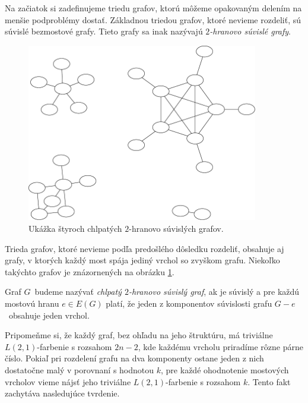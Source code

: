 Na začiatok si zadefinujeme triedu grafov, ktorú môžeme opakovaným delením na menšie
podproblémy dostať. Základnou triedou grafov, ktoré nevieme rozdeliť, sú súvislé
bezmostové grafy. Tieto grafy sa inak nazývajú \emph{$2$-hranovo súvislé grafy}.

\begin{figure}
\centerline{\includegraphics[width=0.9\textwidth]{images/ec2_example.pdf}}

\caption[Chlpaté $2$-hranovo súvislé grafy]{Ukážka štyroch
chlpatých $2$-hranovo súvislých grafov.}

\label{graf:ec2}
\end{figure}

Trieda grafov, ktoré nevieme podľa predošlého dôsledku rozdeliť, obsahuje aj grafy,
v ktorých každý most spája jediný vrchol so zvyškom grafu. Niekoľko takýchto grafov je
znázornených na obrázku \ref{graf:ec2}.

\begin{defn}
    Graf $G$ budeme nazývať \emph{chlpatý $2$-hranovo súvislý graf}, ak je súvislý a pre
    každú mostovú hranu $e \in E(G)$ platí, že jeden z komponentov súvislosti grafu
    $G - e$ obsahuje jeden vrchol.
\end{defn}

Pripomeňme si, že každý graf, bez ohľadu na jeho štruktúru, má triviálne $L(2,1)$-farbenie
s rozsahom $2n - 2$, kde každému vrcholu priradíme rôzne párne číslo. Pokiaľ pri rozdelení
grafu na dva komponenty ostane jeden z nich dostatočne malý v porovnaní s hodnotou $k$,
pre každé ohodnotenie mostových vrcholov vieme nájsť jeho triviálne $L(2,1)$-farbenie s
rozsahom $k$. Tento fakt zachytáva nasledujúce tvrdenie.

